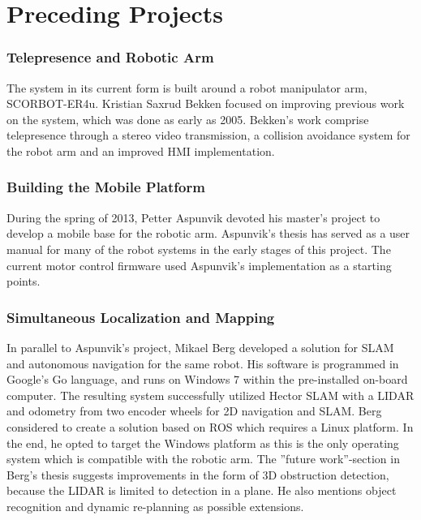 \section{Preceding Projects}

\subsubsection{Telepresence and Robotic Arm}

The system in its current form is built around a robot manipulator arm, SCORBOT-ER4u. Kristian Saxrud Bekken focused on improving previous work on the system, which was done as early as 2005\cite{bekken}. Bekken's work comprise telepresence through a stereo video transmission, a collision avoidance system for the robot arm and an improved \ac{HMI} implementation.

\subsubsection{Building the Mobile Platform}
During the spring of 2013, Petter Aspunvik devoted his master's project to develop a mobile base for the robotic arm\cite{aspunvik}. Aspunvik's thesis has served as a user manual for many of the robot systems in the early stages of this project. The current motor control firmware used Aspunvik's implementation as a starting points.

\subsubsection{Simultaneous Localization and Mapping}

In parallel to Aspunvik's project, Mikael Berg developed a solution for \ac{SLAM} and autonomous navigation for the same robot\cite{berg}. His software is programmed in Google's Go language, and runs on Windows 7 within the pre-installed on-board computer. The resulting system successfully utilized Hector SLAM with a LIDAR and odometry from two encoder wheels for 2D navigation and \ac{SLAM}. Berg considered to create a solution based on \ac{ROS} which requires a Linux platform. In the end, he opted to target the Windows platform as this is the only operating system which is compatible with the robotic arm. The ''future work''-section in Berg's thesis suggests improvements in the form of 3D obstruction detection, because the LIDAR is limited to detection in a plane. He also mentions object recognition and dynamic re-planning as possible extensions. 

